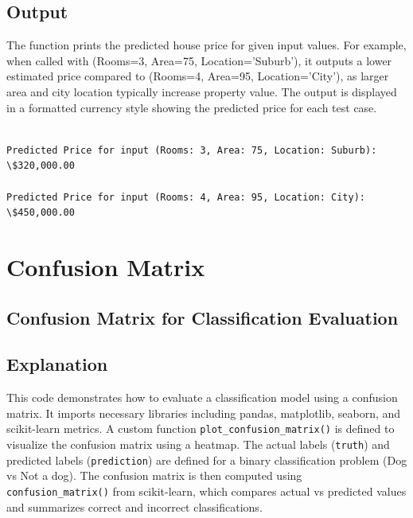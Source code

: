 \documentclass[11pt,a4paper]{report}
\begin{document}
\subsection*{Output}
The function prints the predicted house price for given input values. For example, when called with (Rooms=3, Area=75, Location='Suburb'), it outputs a lower estimated price compared to (Rooms=4, Area=95, Location='City'), as larger area and city location typically increase property value. The output is displayed in a formatted currency style showing the predicted price for each test case.

\begin{Verbatim}[commandchars=\\\{\}]

Predicted Price for input (Rooms: 3, Area: 75, Location: Suburb): \$320,000.00

Predicted Price for input (Rooms: 4, Area: 95, Location: City): \$450,000.00
    \end{Verbatim}

\newpage
\section{Confusion Matrix}\label{confusion-matrix}

\subsection{Confusion Matrix for Classification Evaluation}

\subsection*{Explanation}
This code demonstrates how to evaluate a classification model using a confusion matrix. It imports necessary libraries including pandas, matplotlib, seaborn, and scikit-learn metrics. A custom function \texttt{plot\_confusion\_matrix()} is defined to visualize the confusion matrix using a heatmap. The actual labels (\texttt{truth}) and predicted labels (\texttt{prediction}) are defined for a binary classification problem (Dog vs Not a dog). The confusion matrix is then computed using \texttt{confusion\_matrix()} from scikit-learn, which compares actual vs predicted values and summarizes correct and incorrect classifications.
\end{document}
